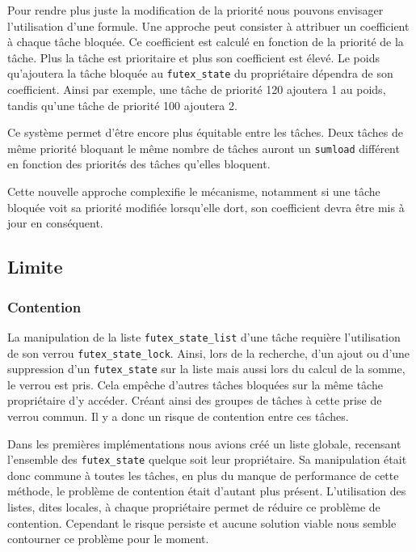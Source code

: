 Pour rendre plus juste la modification de la priorité nous pouvons envisager l'utilisation d'une formule.
Une approche peut consister à attribuer un coefficient à chaque tâche bloquée. 
Ce coefficient est calculé en fonction de la priorité de la tâche. 
Plus la tâche est prioritaire et plus son coefficient est élevé.
Le poids qu'ajoutera la tâche bloquée au \verb|futex_state| du propriétaire dépendra de son coefficient.
Ainsi par exemple, une tâche de priorité 120 ajoutera 1 au poids, tandis qu'une tâche de priorité 100
ajoutera 2. 

Ce système permet d'être encore plus équitable entre les tâches. Deux tâches de même priorité bloquant
le même nombre de tâches auront un \verb|sumload| différent en fonction des priorités des tâches qu'elles bloquent.

Cette nouvelle approche complexifie le mécanisme, notamment si une tâche bloquée voit sa priorité modifiée
lorsqu'elle dort, son coefficient devra être mis à jour en conséquent.



\subsection{Limite}

\subsubsection{Contention}
La manipulation de la liste \verb|futex_state_list| d'une tâche requière l'utilisation de son verrou
\verb|futex_state_lock|. Ainsi, lors de la recherche, d'un ajout ou d'une suppression d'un \verb|futex_state|
sur la liste mais aussi lors du calcul de la somme, le verrou est pris. Cela empêche d'autres tâches bloquées
sur la même tâche propriétaire d'y accéder. Créant ainsi des groupes de tâches à cette prise de
verrou commun. Il y a donc un risque de contention entre ces tâches.

Dans les premières implémentations nous avions créé un liste globale, recensant l'ensemble des \verb|futex_state| quelque soit
leur propriétaire. Sa manipulation était donc commune à toutes les tâches, en plus du manque de performance de 
cette méthode, le problème de contention était d'autant plus présent. L'utilisation des listes, dites locales, à chaque
propriétaire permet de réduire ce problème de contention. Cependant le risque persiste et aucune solution 
viable nous semble contourner ce problème pour le moment.